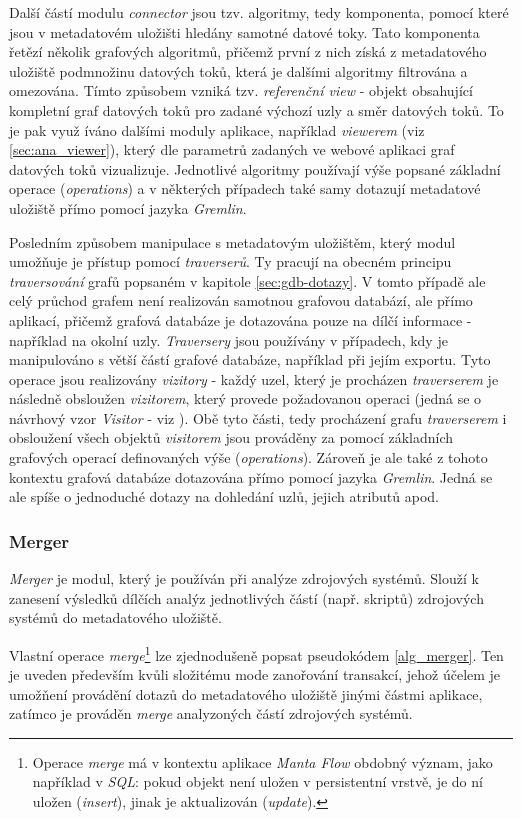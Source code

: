 Další částí modulu \textit{connector} jsou tzv. algoritmy, tedy komponenta, pomocí které jsou v metadatovém uložišti hledány samotné datové toky. Tato komponenta řetězí několik grafových algoritmů, přičemž první z nich získá z metadatového uložiště podmnožinu datových toků, která je dalšími algoritmy filtrována a omezována. Tímto způsobem vzniká tzv. \textit{referenční view} - objekt obsahující kompletní graf datových toků pro zadané výchozí uzly a směr datových toků. To je pak využ   íváno dalšími moduly aplikace, například \textit{viewerem} (viz \ref{sec:ana_viewer}), který dle parametrů zadaných ve webové aplikaci graf datových toků vizualizuje.
Jednotlivé algoritmy používají výše popsané základní operace (\textit{operations}) a v některých případech také samy dotazují metadatové uložiště přímo pomocí jazyka \textit{Gremlin}. 

Posledním způsobem manipulace s metadatovým uložištěm, který modul umožňuje je přístup pomocí \textit{traverserů}. Ty pracují na obecném principu \textit{traversování} grafů popsaném v kapitole \ref{sec:gdb-dotazy}. V tomto případě ale celý průchod grafem není realizován samotnou grafovou databází, ale přímo aplikací, přičemž grafová databáze je dotazována pouze na dílčí informace - například na okolní uzly. \textit{Traversery} jsou používány v případech, kdy je manipulováno s větší částí grafové databáze, například při jejím exportu. Tyto operace jsou realizovány \textit{vizitory} - každý uzel, který je procházen \textit{traverserem} je následně obsloužen \textit{vizitorem}, který provede požadovanou operaci (jedná se o návrhový vzor \textit{Visitor} - viz \cite{Gamma94}). Obě tyto části, tedy procházení grafu \textit{traverserem} i obsloužení všech objektů \textit{visitorem} jsou prováděny za pomocí základních grafových operací definovaných výše (\textit{operations}). Zároveň je ale také z tohoto kontextu grafová databáze dotazována přímo pomocí jazyka \textit{Gremlin}. Jedná se ale spíše o jednoduché dotazy na dohledání uzlů, jejich atributů apod. 

\subsubsection{Merger}
\textit{Merger} je modul, který je používán při analýze zdrojových systémů. Slouží k zanesení výsledků dílčích analýz jednotlivých částí (např. skriptů) zdrojových systémů do metadatového uložiště. 

Vlastní operace \textit{merge}\footnote{Operace \textit{merge} má v kontextu aplikace \textit{Manta Flow} obdobný význam, jako například v \textit{SQL}: pokud objekt není uložen v persistentní vrstvě, je do ní uložen (\textit{insert}), jinak je aktualizován (\textit{update}).} lze zjednodušeně popsat pseudokódem \ref{alg_merger}. Ten je uveden především kvůli složitému mode zanořování transakcí, jehož účelem je umožňení provádění dotazů do metadatového uložiště jinými částmi aplikace, zatímco je prováděn \textit{merge} analyzoných částí zdrojových systémů. %

